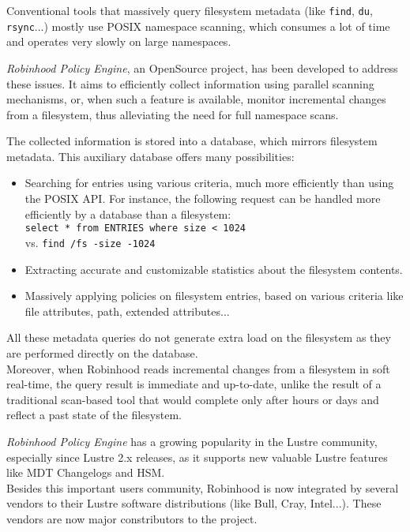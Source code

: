 \documentclass[conference]{IEEEtran}
\begin{document}
Conventional tools that massively query filesystem metadata (like {\tt find},
{\tt du}, {\tt rsync}...) mostly use POSIX\cite{POSIX} name\-space scanning, which
consumes a lot of time and operates very slowly on large namespaces.

\emph{Robinhood Policy Engine}, an OpenSource project, has been developed to
address these issues. It aims to efficiently collect information using parallel
scanning me\-cha\-nisms, or, when such a feature is available, monitor incremental changes from a filesystem,
thus alleviating the need for full namespace scans.

The collected information is stored into a database, which mirrors filesystem
metadata. This auxiliary database offers many possibilities:

\begin{itemize}
\item Searching for entries using various criteria, much more efficiently than
using the POSIX API. For instance, the following request can be handled more efficiently by a database
than a filesystem:\\
{\tt \small select * from ENTRIES where size < 1024}\\
vs.
{\tt \small find /fs -size -1024}
\item Extracting accurate and customizable statistics about the
filesystem contents.
\item Massively applying policies on filesystem entries,
based on various criteria like file attributes, path, extended attributes...
\end{itemize}
All these metadata queries do not generate extra load on the
filesystem as they are performed directly on the database.
\\ Moreover, when Robinhood reads incremental changes
from a filesystem in soft real-time,
the query result is immediate and up-to-date, unlike the result of a traditional
scan-based tool that would complete only after hours or days and reflect a past
state of the filesystem.


\emph{Robinhood Policy Engine} has a growing popularity in the Lustre community,
especially since Lustre 2.x releases, as it supports new valuable Lustre features
like MDT Changelogs and HSM. \\
Besides this important users community, Robinhood is now integrated by several vendors
to their Lustre software distributions (like Bull, Cray, Intel...). These vendors are now major constributors to the project.
\end{document}
